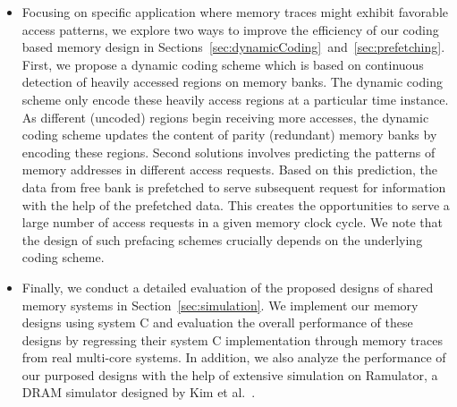 \begin{itemize}
\item Focusing on specific application where memory traces might exhibit favorable access patterns, we explore two ways to improve the efficiency of our coding based memory design in Sections~\ref{sec:dynamicCoding}~and~\ref{sec:prefetching}. First, we propose a dynamic coding scheme which is based on continuous detection of heavily accessed regions on memory banks. The dynamic coding scheme only encode these heavily access regions at a particular time instance. As different (uncoded) regions begin receiving more accesses, the dynamic coding scheme updates the content of parity (redundant) memory banks by encoding these regions. {\color{red}Second solutions involves predicting the patterns of memory addresses in different access requests. Based on this prediction, the data from free bank is prefetched to serve subsequent request for information with the help of the prefetched data. This creates the opportunities to serve a large number of access requests in a given memory clock cycle. We note that the design of such prefacing schemes crucially depends on the underlying coding scheme.}
\item {\color{blue}Finally, we conduct a detailed evaluation of the proposed designs of shared memory systems in Section~\ref{sec:simulation}. We implement our memory designs using system C and evaluation the overall performance of these designs by regressing their system C implementation through memory traces from real multi-core systems. In addition, we also analyze the performance of our purposed designs with the help of extensive simulation on Ramulator, a DRAM simulator designed by Kim et al.~\cite{Ramulator}.} %
\end{itemize}



